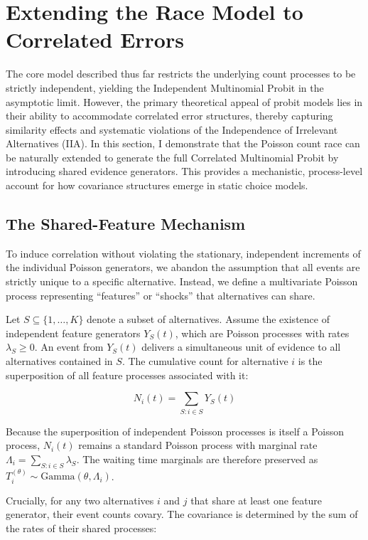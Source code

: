\documentclass[
  man,
  floatsintext,
  longtable,
  a4paper,
  nolmodern,
  notxfonts,
  notimes,
  colorlinks=true,linkcolor=blue,citecolor=blue,urlcolor=blue]{apa7}
\begin{document}
\section{Extending the Race Model to Correlated
Errors}\label{sec-correlated-errors}

The core model described thus far restricts the underlying count
processes to be strictly independent, yielding the Independent
Multinomial Probit in the asymptotic limit. However, the primary
theoretical appeal of probit models lies in their ability to accommodate
correlated error structures, thereby capturing similarity effects and
systematic violations of the Independence of Irrelevant Alternatives
(IIA). In this section, I demonstrate that the Poisson count race can be
naturally extended to generate the full Correlated Multinomial Probit by
introducing shared evidence generators. This provides a mechanistic,
process-level account for how covariance structures emerge in static
choice models.

\subsection{The Shared-Feature
Mechanism}\label{the-shared-feature-mechanism}

To induce correlation without violating the stationary, independent
increments of the individual Poisson generators, we abandon the
assumption that all events are strictly unique to a specific
alternative. Instead, we define a multivariate Poisson process
representing ``features'' or ``shocks'' that alternatives can share.

Let \(S \subseteq \{1, \dots, K\}\) denote a subset of alternatives.
Assume the existence of independent feature generators \(Y_S(t)\), which
are Poisson processes with rates \(\lambda_S \ge 0\). An event from
\(Y_S(t)\) delivers a simultaneous unit of evidence to all alternatives
contained in \(S\). The cumulative count for alternative \(i\) is the
superposition of all feature processes associated with it:

\[N_i(t) = \sum_{S: i \in S} Y_S(t)\]

Because the superposition of independent Poisson processes is itself a
Poisson process, \(N_i(t)\) remains a standard Poisson process with
marginal rate \(\Lambda_i = \sum_{S: i \in S} \lambda_S\). The waiting
time marginals are therefore preserved as
\(T_i^{(\theta)} \sim \text{Gamma}(\theta, \Lambda_i)\).

Crucially, for any two alternatives \(i\) and \(j\) that share at least
one feature generator, their event counts covary. The covariance is
determined by the sum of the rates of their shared processes:
\end{document}
